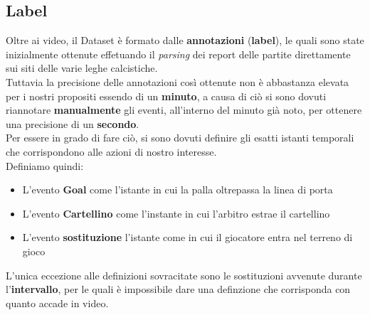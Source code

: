 \subsection{Label}
Oltre ai video, il Dataset è formato dalle \textbf{annotazioni} (\textbf{label}), le quali sono state inizialmente ottenute effetuando il \textit{parsing} dei report delle partite direttamente sui siti delle varie leghe calcistiche.
\\Tuttavia la precisione delle annotazioni così ottenute non è abbastanza elevata per i nostri propositi essendo di un \textbf{minuto}, a causa di ciò si sono dovuti riannotare \textbf{manualmente} gli eventi, all'interno del minuto già noto, per ottenere una precisione di un \textbf{secondo}.
\\Per essere in grado di fare ciò, si sono dovuti definire gli esatti istanti temporali che corrispondono alle azioni di nostro interesse.
\\Definiamo quindi:
\begin{itemize}
\item L'evento \textbf{Goal} come l'istante in cui la palla oltrepassa la linea di porta
\item L'evento \textbf{Cartellino} come l'instante in cui l'arbitro estrae il cartellino
\item L'evento \textbf{sostituzione} l'istante come in cui il giocatore entra nel terreno di gioco
\end{itemize}
L'unica eccezione alle definizioni sovracitate sono le sostituzioni avvenute durante l'\textbf{intervallo}, per le quali è impossibile dare una definzione che corrisponda con quanto accade in video.
